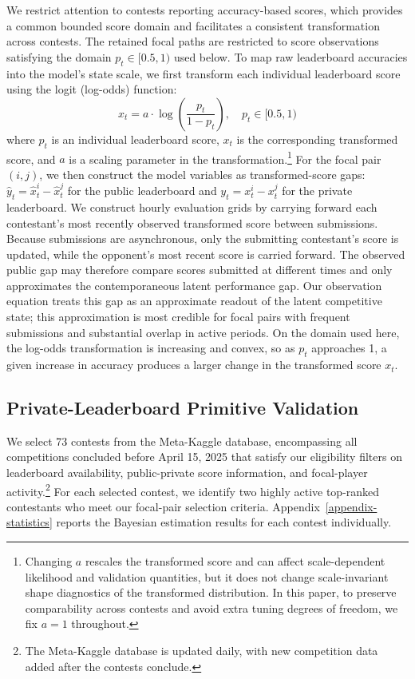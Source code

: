 \documentclass[mnsc]{informs3}
\begin{document}
We restrict attention to contests reporting accuracy-based scores, which provides a common bounded score domain and facilitates a consistent transformation across contests.
The retained focal paths are restricted to score observations satisfying the domain $p_t\in[0.5,1)$ used below.
To map raw leaderboard accuracies into the model's state scale, we first transform each individual leaderboard score using the logit (log-odds) function:
\begin{equation}\label{eq-leaderboard-transform}
x_t = a \cdot \log\left(\frac{p_t}{1-p_t}\right), \quad p_t\in[0.5,1)
\end{equation}
where $p_t$ is an individual leaderboard score, $x_t$ is the corresponding transformed score, and $a$ is a scaling parameter in the transformation.\footnote{
Changing $a$ rescales the transformed score and can affect scale-dependent likelihood and validation quantities, but it does not change scale-invariant shape diagnostics of the transformed distribution.
In this paper, to preserve comparability across contests and avoid extra tuning degrees of freedom, we fix $a=1$ throughout.
}
For the focal pair $(i,j)$, we then construct the model variables as transformed-score gaps: $\hat y_t=\hat x_t^i-\hat x_t^j$ for the public leaderboard and $y_t=x_t^i-x_t^j$ for the private leaderboard.
We construct hourly evaluation grids by carrying forward each contestant's most recently observed transformed score between submissions.
Because submissions are asynchronous, only the submitting contestant’s score is updated, while the opponent’s most recent score is carried forward. 
The observed public gap may therefore compare scores submitted at different times and only approximates the contemporaneous latent performance gap.
Our observation equation treats this gap as an approximate readout of the latent competitive state; this approximation is most credible for focal pairs with frequent submissions and substantial overlap in active periods.
On the domain used here, the log-odds transformation is increasing and convex, so as $p_t$ approaches 1, a given increase in accuracy produces a larger change in the transformed score $x_t$.


\subsection{Private-Leaderboard Primitive Validation}\label{sect-validation}


We select 73 contests from the Meta-Kaggle database, encompassing all competitions concluded before April 15, 2025 that satisfy our eligibility filters on leaderboard availability, public-private score information, and focal-player activity.\footnote{
The Meta-Kaggle database is updated daily, with new competition data added after the contests conclude.
}
For each selected contest, we identify two highly active top-ranked contestants who meet our focal-pair selection criteria.
Appendix~\ref{appendix-statistics} reports the Bayesian estimation results for each contest individually.
\end{document}
